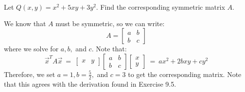 \documentclass{article}
\begin{document}
\setcounter{subsection}{9}
\setcounter{exr}{5}

\begin{exr}
    Let $ Q(x, y) = x^{2} + 5xy + 3y^{2} $. Find the corresponding symmetric matrix $ A $.
\end{exr}

\begin{pf}
    We know that $ A $ must be symmetric, so we can write:
    \begin{equation*}
        A = \begin{bmatrix}
            a & b \\ b & c
        \end{bmatrix}
    \end{equation*}
    where we solve for $ a, b, $ and $ c $.
    Note that:
    \begin{equation*}
        \vec{x}^{T}A\vec{x} \ = \
        \begin{bmatrix}
            x & y
        \end{bmatrix}
        \begin{bmatrix}
            a & b \\ b & c
        \end{bmatrix}
        \begin{bmatrix}
            x \\ y
        \end{bmatrix} \ = \
        ax^{2} + 2bxy + cy^{2}
    \end{equation*}
    Therefore, we set $ a = 1, b = \frac{5}{2}, $ and $ c = 3 $ to get the corresponding matrix.
    Note that this agrees with the derivation found in Exercise 9.5.
\end{pf}
\end{document}
